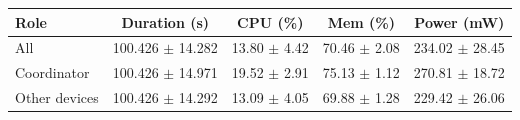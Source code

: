 \begin{tabular}{lcccc}
\hline
\textbf{Role} & \textbf{Duration (s)} & \textbf{CPU (\%)} & \textbf{Mem (\%)} & \textbf{Power (mW)} \\
\hline
All & 100.426 $\pm$ 14.282 & 13.80 $\pm$ 4.42 & 70.46 $\pm$ 2.08 & 234.02 $\pm$ 28.45 \\
Coordinator & 100.426 $\pm$ 14.971 & 19.52 $\pm$ 2.91 & 75.13 $\pm$ 1.12 & 270.81 $\pm$ 18.72 \\
Other devices & 100.426 $\pm$ 14.292 & 13.09 $\pm$ 4.05 & 69.88 $\pm$ 1.28 & 229.42 $\pm$ 26.06 \\
\hline
\end{tabular}

